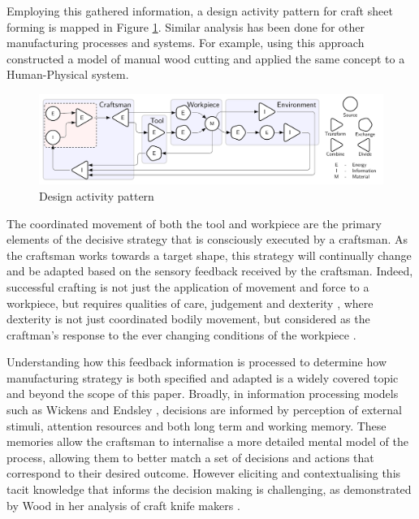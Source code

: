 Employing this gathered information, a design activity pattern for craft sheet forming is mapped in Figure \ref{fig:DAP}. Similar analysis has been done for other manufacturing processes and systems. For example, using this approach \citep{Roth1981FoundationDesign} constructed a model of manual wood cutting and \cite{Zhou2018TowardManufacturing} applied the same concept to a Human-Physical system. 

\begin{figure}[h]
  \centering
  \includegraphics[width=\linewidth]{Images/DesignActivityPattern.pdf}  
  \caption{Design activity pattern}
  \label{fig:DAP}
\end{figure}

The coordinated movement of both the tool and workpiece are the primary elements of the decisive strategy that is consciously executed by a craftsman. As the craftsman works towards a target shape, this strategy will continually change and be adapted based on the sensory feedback received by the craftsman. Indeed, successful crafting is not just the application of movement and force to a workpiece, but requires qualities of care, judgement and dexterity \citep{Pye2008TheWorkmanship}, where dexterity is not just coordinated bodily movement, but considered as the craftman's response to the ever changing conditions of the workpiece \citep{Ingold2001BeyondSkill}. 

Understanding how this feedback information is processed to determine how manufacturing strategy is both specified and adapted is a widely covered topic and beyond the scope of this paper. Broadly, in information processing models such as Wickens \citep{Wickens2015EngineeringPerformance} and Endsley \citep{Endsley1995TowardSystems}, decisions are informed by perception of external stimuli, attention resources and both long term and working memory. These memories allow the craftsman to internalise a more detailed mental model of the process, allowing them to better match a set of decisions and actions that correspond to their desired outcome. However eliciting and contextualising this tacit knowledge that informs the decision making is challenging, as demonstrated by Wood in her analysis of craft knife makers \citep{wood2006transmitting}. %



